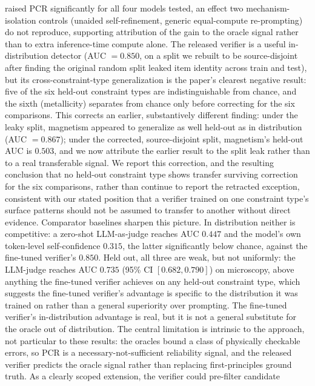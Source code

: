 \documentclass[pdflatex,sn-nature]{sn-jnl}
\begin{document}
raised PCR significantly for all four models tested, an effect two mechanism-isolation
controls (unaided self-refinement, generic equal-compute re-prompting) do not reproduce,
supporting attribution of the gain to the oracle signal rather than to extra
inference-time compute alone. The released verifier is a useful in-distribution
detector (AUC $=0.850$, on a split we rebuilt to be source-disjoint after finding the
original random split leaked item identity across train and test), but its
cross-constraint-type generalization is the paper's clearest
negative result: five of the six held-out constraint types are indistinguishable from
chance, and the sixth (metallicity) separates from chance only before correcting for the
six comparisons.
This corrects an earlier, substantively different finding: under the leaky split, magnetism
appeared to generalize as well held-out as in distribution (AUC $=0.867$); under the
corrected, source-disjoint split, magnetism's held-out AUC is $0.503$, and we now attribute
the earlier result to the split leak rather than to a real transferable signal. We report
this correction, and the resulting conclusion that no held-out constraint type shows transfer
surviving correction for the six comparisons, rather than continue to report the
retracted exception, consistent with our stated position that a verifier trained on one
constraint type's surface patterns should not be assumed to transfer to another
without direct evidence. Comparator baselines sharpen this picture. In distribution
neither is competitive: a zero-shot LLM-as-judge reaches AUC $0.447$ and the model's own
token-level self-confidence $0.315$, the latter significantly below chance, against the
fine-tuned verifier's $0.850$. Held out, all three are weak, but not uniformly: the
LLM-judge reaches AUC $0.735$ (95\% CI $[0.682,0.790]$) on microscopy, above anything the
fine-tuned verifier achieves on any held-out constraint type, which suggests the fine-tuned
verifier's advantage is specific to the distribution it was trained on rather than a general
superiority over prompting. The fine-tuned verifier's in-distribution advantage is real, but it is
not a general substitute for the oracle out of distribution. The central limitation is intrinsic to the approach, not
particular to these results: the oracles bound a class of physically checkable
errors, so PCR is a necessary-not-sufficient reliability signal, and the released
verifier predicts the oracle signal rather than replacing first-principles ground
truth. As a clearly scoped extension, the verifier could pre-filter candidate
\end{document}
